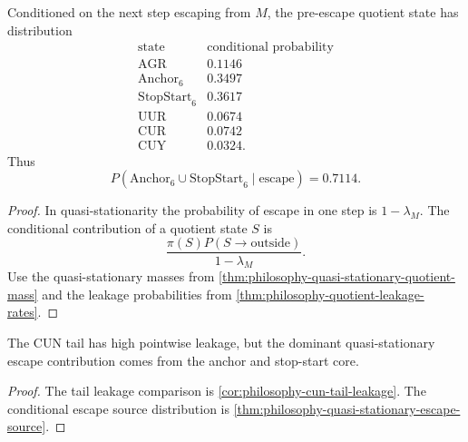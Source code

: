 \begin{theorem}
\label{thm:philosophy-quasi-stationary-escape-source}
Conditioned on the next step escaping from $M$, the pre-escape quotient
state has distribution
$$
\begin{array}{c|r}
  \text{state} & \text{conditional probability}\\
  \hline
  \mathrm{AGR} & 0.1146\\
  \mathrm{Anchor}_{6} & 0.3497\\
  \mathrm{StopStart}_{6} & 0.3617\\
  \mathrm{UUR} & 0.0674\\
  \mathrm{CUR} & 0.0742\\
  \mathrm{CUY} & 0.0324.
\end{array}
$$
Thus
$$
  P(\mathrm{Anchor}_{6}\cup\mathrm{StopStart}_{6}\mid\text{escape})
  =
  0.7114.
$$
\end{theorem}
\begin{proof}
In quasi-stationarity the probability of escape in one step is
$1-\lambda_M$. The conditional contribution of a quotient state $S$ is
$$
  \frac{\pi(S)P(S\to\text{outside})}{1-\lambda_M}.
$$
Use the quasi-stationary masses from
\autoref{thm:philosophy-quasi-stationary-quotient-mass} and the leakage
probabilities from \autoref{thm:philosophy-quotient-leakage-rates}.
\end{proof}

\begin{corollary}
\label{cor:philosophy-escape-mass-versus-pointwise-leakage}
The CUN tail has high pointwise leakage, but the dominant
quasi-stationary escape contribution comes from the anchor and
stop-start core.
\end{corollary}
\begin{proof}
The tail leakage comparison is
\autoref{cor:philosophy-cun-tail-leakage}. The conditional escape
source distribution is
\autoref{thm:philosophy-quasi-stationary-escape-source}.
\end{proof}

